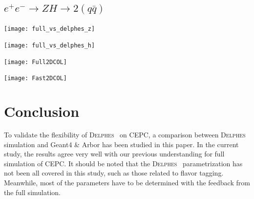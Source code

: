 \documentclass[a4paper,10pt,twoside]{cpc-hepnp}
\begin{document}
\subsection{$e^+e^- \to ZH \to 2(q\bar{q})$}

\begin{center}
\texttt{[image: full\_vs\_delphes\_z]}
\end{center}
\begin{center}
\texttt{[image: full\_vs\_delphes\_h]}
\end{center}


\begin{center}
\texttt{[image: Full2DCOL]}
\end{center}
\begin{center}
\texttt{[image: Fast2DCOL]}
\end{center}

\section{Conclusion\label{sec:conclusion}}
To validate the flexibility of {\textsc{Delphes}~} on CEPC, a comparison between {\textsc{Delphes}~} simulation and Geant4 \& Arbor has been studied in this paper. In the current study, the results agree very well with our previous understanding for full simulation of CEPC. It should be noted that the {\textsc{Delphes}~} parametrization has not been all covered in this study, such as those related to flavor tagging. Meanwhile, most of the parameters have to be determined with the feedback from the full simulation.
\vspace{3mm}
\end{document}
